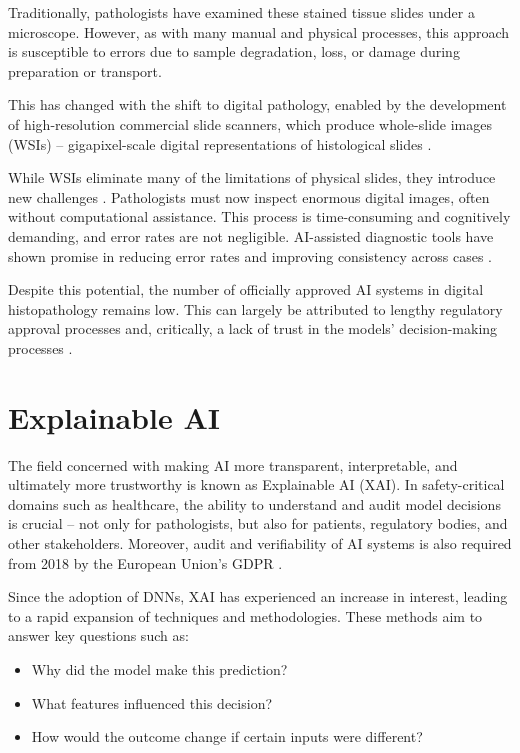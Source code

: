 Traditionally, pathologists have examined these stained tissue slides under a microscope.
However, as with many manual and physical processes, this approach is susceptible to errors due to sample degradation, loss, or damage during preparation or transport.

This has changed with the shift to digital pathology, enabled by the development of high-resolution commercial slide scanners,
which produce whole-slide images (WSIs) -- gigapixel-scale digital representations of histological slides \cite{cooper2023machine}.

While WSIs eliminate many of the limitations of physical slides,
they introduce new challenges \cite{aeffner2019introduction}.
Pathologists must now inspect enormous digital images,
often without computational assistance. This process is time-consuming and cognitively demanding,
and error rates are not negligible. AI-assisted diagnostic tools have shown promise in reducing error rates
and improving consistency across cases \cite{dy2024ai}.

Despite this potential, the number of officially approved AI systems in digital histopathology remains low.
This can largely be attributed to lengthy regulatory approval processes and,
critically, a lack of trust in the models' decision-making processes \cite{aggarwal2025artificial}.


\section{Explainable AI}

The field concerned with making AI more transparent, interpretable, and ultimately more trustworthy is known as Explainable AI (XAI).
In safety-critical domains such as healthcare, the ability to understand and audit model decisions is crucial -- not only for pathologists,
but also for patients, regulatory bodies, and other stakeholders. Moreover, audit and verifiability of AI systems is also required from 2018 by the European Union's GDPR \cite{goodman2017european}.

\newpage

Since the adoption of DNNs, XAI has experienced an increase in interest,
leading to a rapid expansion of techniques and methodologies.
These methods aim to answer key questions such as:
\begin{itemize}
    \item Why did the model make this prediction?
    \item What features influenced this decision?
    \item How would the outcome change if certain inputs were different?
\end{itemize}

